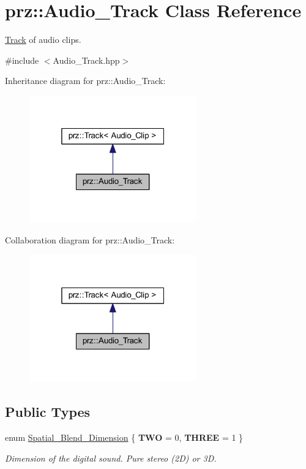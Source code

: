 \hypertarget{classprz_1_1_audio___track}{}\section{prz\+::Audio\+\_\+\+Track Class Reference}
\label{classprz_1_1_audio___track}


\mbox{\hyperlink{classprz_1_1_track}{Track}} of audio clips.  




{\ttfamily \#include $<$Audio\+\_\+\+Track.\+hpp$>$}



Inheritance diagram for prz\+::Audio\+\_\+\+Track\+:
\nopagebreak
\begin{figure}[H]
\begin{center}
\leavevmode
\includegraphics[width=205pt]{classprz_1_1_audio___track__inherit__graph}
\end{center}
\end{figure}


Collaboration diagram for prz\+::Audio\+\_\+\+Track\+:
\nopagebreak
\begin{figure}[H]
\begin{center}
\leavevmode
\includegraphics[width=205pt]{classprz_1_1_audio___track__coll__graph}
\end{center}
\end{figure}
\subsection*{Public Types}
\begin{DoxyCompactItemize}
\item 
enum \mbox{\hyperlink{classprz_1_1_audio___track_a4fb1dc3dd45713ba4c3e56918721d12a}{Spatial\+\_\+\+Blend\+\_\+\+Dimension}} \{ {\bfseries T\+WO} = 0, 
{\bfseries T\+H\+R\+EE} = 1
 \}
\begin{DoxyCompactList}\small\item\em Dimension of the digital sound. Pure stereo (2D) or 3D. \end{DoxyCompactList}\end{DoxyCompactItemize}
